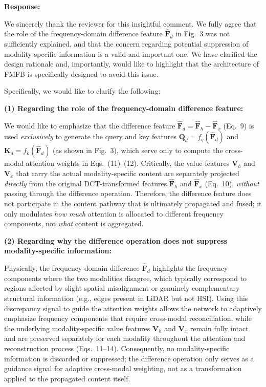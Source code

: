 \textbf{Response:}

We sincerely thank the reviewer for this insightful comment. We fully agree that the role of the frequency-domain difference feature $\hat{\mathbf{F}}_d$ in Fig.~3 was not sufficiently explained, and that the concern regarding potential suppression of modality-specific information is a valid and important one. We have clarified the design rationale and, importantly, would like to highlight that the architecture of FMFB is specifically designed to avoid this issue.

Specifically, we would like to clarify the following:

\textbf{(1) Regarding the role of the frequency-domain difference feature:}

We would like to emphasize that the difference feature $\hat{\mathbf{F}}_d = \hat{\mathbf{F}}_h - \hat{\mathbf{F}}_x$ (Eq.~9) is used \textit{exclusively} to generate the query and key features $\mathbf{Q}_d = f_q(\hat{\mathbf{F}}_d)$ and $\mathbf{K}_d = f_k(\hat{\mathbf{F}}_d)$ (as shown in Fig.~3), which serve only to compute the cross-modal attention weights in Eqs.~(11)--(12). Critically, the value features $\mathbf{V}_h$ and $\mathbf{V}_x$ that carry the actual modality-specific content are separately projected \textit{directly} from the original DCT-transformed features $\hat{\mathbf{F}}_h$ and $\hat{\mathbf{F}}_x$ (Eq.~10), \textit{without} passing through the difference operation. Therefore, the difference feature does not participate in the content pathway that is ultimately propagated and fused; it only modulates \textit{how much} attention is allocated to different frequency components, not \textit{what} content is aggregated.

\textbf{(2) Regarding why the difference operation does not suppress modality-specific information:}

Physically, the frequency-domain difference $\hat{\mathbf{F}}_d$ highlights the frequency components where the two modalities disagree, which typically correspond to regions affected by slight spatial misalignment or genuinely complementary structural information (e.g., edges present in LiDAR but not HSI). Using this discrepancy signal to guide the attention weights allows the network to adaptively emphasize frequency components that require cross-modal reconciliation, while the underlying modality-specific value features $\mathbf{V}_h$ and $\mathbf{V}_x$ remain fully intact and are preserved separately for each modality throughout the attention and reconstruction process (Eqs.~11--14). Consequently, no modality-specific information is discarded or suppressed; the difference operation only serves as a guidance signal for adaptive cross-modal weighting, not as a transformation applied to the propagated content itself.

